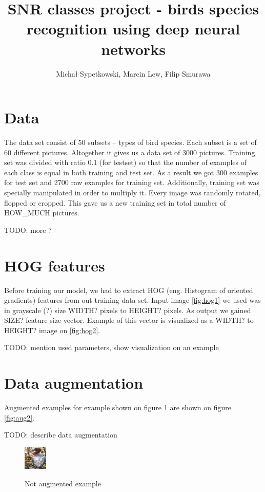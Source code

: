 \documentclass[a4paper]{article}
\begin{document}
\title{SNR classes project - birds species recognition using deep neural networks}

\author{Michał Sypetkowski, Marcin Lew, Filip Smurawa}
\maketitle

\section{Data}
The data set consist of 50 subsets – types of bird species. Each subset is a set of 60 different pictures. Altogether it gives us a data set of 3000 pictures.
Training set was divided with ratio 0.1 (for testset) so that the number of examples of each class is equal in both training and test set.
As a result we got 300 examples for test set and 2700 raw examples for training set.
Additionally, training set was specially manipulated in order to multiply it. Every image was randomly rotated, flopped or cropped. 
This gave us a new training set in total number of HOW_MUCH pictures.

TODO: more ?

\section{HOG features}
Before training our model, we had to extract HOG (eng. Histogram of oriented gradients) features from out training data set. 
Input image \ref{fig:hog1} we used was in grayscale (?) size WIDTH? pixels to HEIGHT? pixels. As output we gained SIZE? feature size vector. 
Example of this vector is visualized as a WIDTH? to HEIGHT? image on \ref{fig:hog2}.


TODO: mention used parameters, show visualization on an example


\section{Data augmentation}
Augmented examples for example shown on figure \ref{fig:aug1}
are shown on figure \ref{fig:aug2}.

TODO: describe data augmentation

\begin{figure}[h]
    \caption[]{Not augmented example}
    \centering
    \includegraphics[page=2,width=0.1\textwidth]{aug1.png}
    \label{fig:aug1}
\end{figure}
\end{document}
